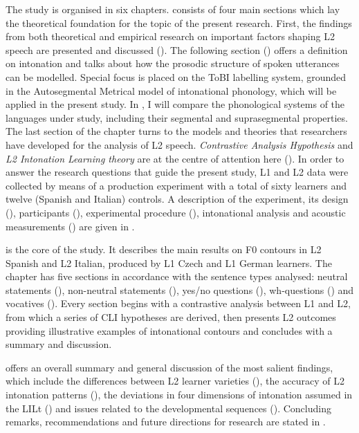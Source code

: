 The study is organised in six chapters.  consists of four main sections which lay the theoretical foundation for the topic of the present research. First, the findings from both theoretical and empirical research on important factors shaping L2 speech are presented and discussed (). The following section () offers a definition on intonation and talks about how the prosodic structure of spoken utterances can be modelled. Special focus is placed on the ToBI labelling system, grounded in the Autosegmental Metrical model of intonational phonology, which will be applied in the present study. In , I will compare the phonological systems of the languages under study, including their segmental and suprasegmental properties. The last section of the chapter turns to the models and theories that researchers have developed for the analysis of L2 speech.  \textit{Contrastive Analysis Hypothesis} and  \textit{L2 Intonation Learning theory} are at the centre of attention here (). In order to answer the research questions that guide the present study, L1 and L2 data were collected by means of a production experiment with a total of sixty learners and twelve (Spanish and Italian) controls. A description of the experiment, its design (), participants (), experimental procedure (), intonational analysis and acoustic measurements () are given in .

 is the core of the study. It describes the main results on F0 contours in L2 Spanish and L2 Italian, produced by L1 Czech and L1 German learners. The chapter has five sections in accordance with the sentence types analysed: neutral statements (), non-neutral statements (), yes/no questions (), wh-questions () and vocatives (). Every section begins with a contrastive analysis between L1 and L2, from which a series of CLI hypotheses are derived, then presents L2 outcomes providing illustrative examples of intonational contours and concludes with a summary and discussion.

 offers an overall summary and general discussion of the most salient findings, which include the differences between L2 learner varieties (), the accuracy of L2 intonation patterns (), the deviations in four dimensions of intonation assumed in the LILt () and issues related to the developmental sequences (). Concluding remarks, recommendations and future directions for research are stated in .
